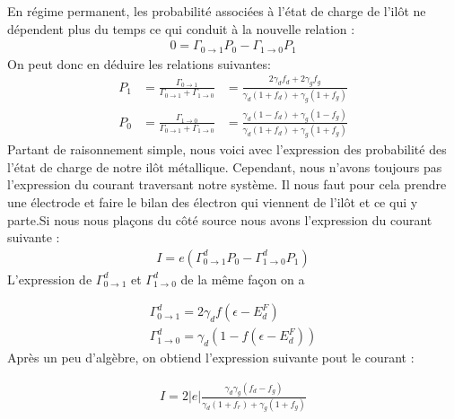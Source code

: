 En régime permanent, les probabilité associées à l'état de charge de l'il\^ot ne dépendent plus du temps ce qui conduit à la nouvelle relation :
\begin{eqnarray}
0 = \Gamma_{0 \rightarrow 1}P_0 - \Gamma_{1 \rightarrow 0}P_1
\end{eqnarray}
On peut donc en déduire les relations suivantes:
\begin{eqnarray}
P_1 &= \frac{\Gamma_{0 \rightarrow 1}}{\Gamma_{0 \rightarrow 1} + \Gamma_{1 \rightarrow 0}} &= \frac{2\gamma_d f_d + 2 \gamma_g f_g}{\gamma_d(1+f_d) + \gamma_g(1 + f_g)} \\
P_0 &= \frac{\Gamma_{1 \rightarrow 0}}{\Gamma_{0 \rightarrow 1} + \Gamma_{1 \rightarrow 0}} &= \frac{\gamma_d(1-f_d) + \gamma_g(1 - f_g)}{\gamma_d(1+f_d) + \gamma_g(1 + f_g)}
\end{eqnarray}
Partant de raisonnement simple, nous voici avec l'expression des probabilité des l'état de charge de notre il\^ot métallique. Cependant, nous n'avons toujours pas l'expression du courant traversant notre système. Il nous faut pour cela prendre une électrode et faire le bilan des électron qui viennent de l'il\^ot et ce qui y parte.Si nous nous plaçons du c\^oté source nous avons l'expression du courant suivante :
\begin{eqnarray}
I = e (\Gamma_{0 \rightarrow 1}^d P_0 - \Gamma_{1 \rightarrow 0}^d P_1)
\end{eqnarray}
L'expression de $\Gamma_{0 \rightarrow 1}^d$ et $\Gamma_{1 \rightarrow 0}^d$ de la m\^eme façon on a 
 
\begin{eqnarray}
\Gamma_{0 \rightarrow 1}^d =  2\gamma_d f(\epsilon - E_d^F)\\
\Gamma_{1 \rightarrow 0}^d = \gamma_d (1- f(\epsilon - E_d^F)) 
\end{eqnarray}
Après un peu d'algèbre, on obtiend l'expression suivante pout le courant :

\begin{eqnarray}
I = 2 |e| \frac{\gamma_d \gamma_g (f_d - f_g)}{\gamma_d(1+f_r) + \gamma_g(1 + f_g)}
\end{eqnarray}





